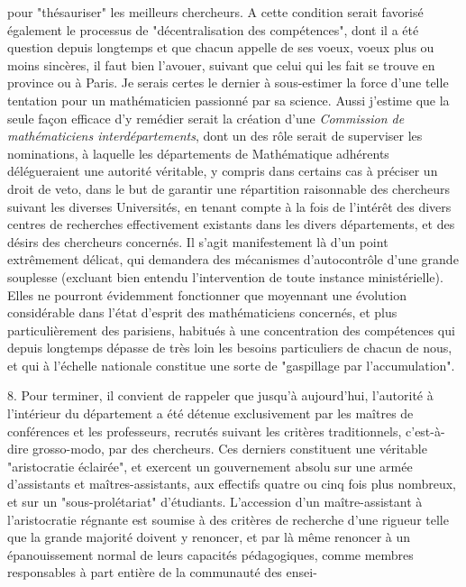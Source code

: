 \documentclass[11pt,a4paper]{article}
\begin{document}

pour "thésauriser" les meilleurs chercheurs. A cette condition serait favorisé également le processus de "décentralisation des compétences", dont il a été question depuis longtemps et que chacun appelle de ses voeux, voeux plus ou moins sincères, il faut bien l'avouer, suivant que celui qui les fait se trouve en province ou à Paris. Je serais certes le dernier à sous-estimer la force d'une telle tentation pour un mathématicien passionné par sa science. Aussi j'estime que la seule façon efficace d'y remédier serait la création d'une \emph{Commission de mathématiciens interdépartements}, dont un des rôle serait de superviser les nominations, à laquelle les départements de Mathématique adhérents délégueraient une autorité véritable, y compris dans certains cas à préciser un droit de veto, dans le but de garantir une répartition raisonnable des chercheurs suivant les diverses Universités, en tenant compte à la fois de l'intérêt des divers centres de recherches effectivement existants dans les divers départements, et des désirs des chercheurs concernés. Il s'agit manifestement là d'un point extrêmement délicat, qui demandera des mécanismes d'autocontrôle d'une grande souplesse (excluant bien entendu l'intervention de toute instance ministérielle). Elles ne pourront évidemment fonctionner que moyennant une évolution considérable dans l'état d'esprit des mathématiciens concernés, et plus particulièrement des parisiens, habitués à une concentration des compétences qui depuis longtemps dépasse de très loin les besoins particuliers de chacun de nous, et qui à l'échelle nationale constitue une sorte de "gaspillage par l'accumulation".

8. Pour terminer, il convient de rappeler que jusqu'à aujourd'hui, l'autorité à l'intérieur du département a été détenue exclusivement par les maîtres de conférences et les professeurs, recrutés suivant les critères traditionnels, c'est-à-dire grosso-modo, par des chercheurs. Ces derniers constituent une véritable "aristocratie éclairée", et exercent un gouvernement absolu sur une armée d'assistants et maîtres-assistants, aux effectifs quatre ou cinq fois plus nombreux, et sur un "sous-prolétariat" d'étudiants. L'accession d'un maître-assistant à l'aristocratie régnante est soumise à des critères de recherche d'une rigueur telle que la grande majorité doivent y renoncer, et par là même renoncer à un épanouissement normal de leurs capacités pédagogiques, comme membres responsables à part entière de la communauté des ensei-
\end{document}

